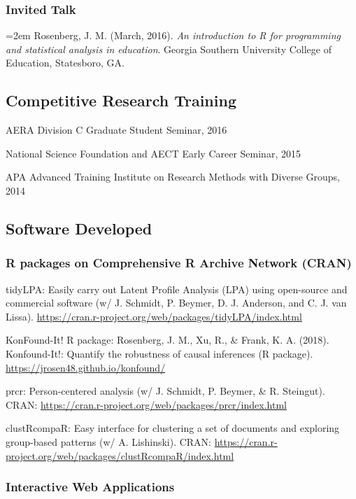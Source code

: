 \documentclass[]{article}
\begin{document}
\subsubsection{Invited Talk}\label{invited-talk}

\hangindent=2em Rosenberg, J. M. (March, 2016). \emph{An introduction to
R for programming and statistical analysis in education}. Georgia
Southern University College of Education, Statesboro, GA.

\subsection{Competitive Research
Training}\label{competitive-research-training}

AERA Division C Graduate Student Seminar, 2016

National Science Foundation and AECT Early Career Seminar, 2015

APA Advanced Training Institute on Research Methods with Diverse Groups,
2014

\subsection{Software Developed}\label{software-developed}

\subsubsection{R packages on Comprehensive R Archive Network
(CRAN)}\label{r-packages-on-comprehensive-r-archive-network-cran}

tidyLPA: Easily carry out Latent Profile Analysis (LPA) using
open-source and commercial software (w/ J. Schmidt, P. Beymer, D. J.
Anderson, and C. J. van Lissa).
\url{https://cran.r-project.org/web/packages/tidyLPA/index.html}

KonFound-It! R package: Rosenberg, J. M., Xu, R., \& Frank, K. A.
(2018). Konfound-It!: Quantify the robustness of causal inferences (R
package). \url{https://jrosen48.github.io/konfound/}

prcr: Person-centered analysis (w/ J. Schmidt, P. Beymer, \& R.
Steingut). CRAN:
\url{https://cran.r-project.org/web/packages/prcr/index.html}

clustRcompaR: Easy interface for clustering a set of documents and
exploring group-based patterns (w/ A. Lishinski). CRAN:
\url{https://cran.r-project.org/web/packages/clustRcompaR/index.html}

\subsubsection{Interactive Web
Applications}\label{interactive-web-applications}
\end{document}
